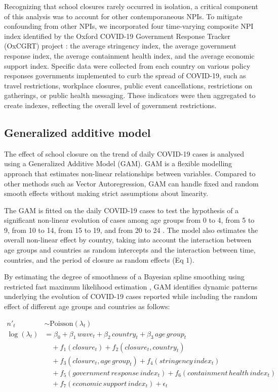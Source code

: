 \documentclass[]{interact}
\theoremstyle{plain}%
\theoremstyle{definition}
\theoremstyle{remark}
\begin{document}
Recognizing that school closures rarely occurred in isolation, a critical component of this analysis was to account for other contemporaneous NPIs. To mitigate confounding from other NPIs, we incorporated four time-varying composite NPI index identified by the Oxford COVID-19 Government Response Tracker (OxCGRT) project \citep{hale2021global}: the average stringency index, the average government response index, the average containment health index, and the average economic support index. Specific data were collected from each country on various policy responses governments implemented to curb the spread of COVID-19, such as travel restrictions, workplace closures, public event cancellations, restrictions on gatherings, or public health messaging. These indicators were then aggregated to create indexes, reflecting the overall level of government restrictions.

\subsection{Generalized additive model}\label{generalized-additive-model}

The effect of school closure on the trend of daily COVID-19 cases is analysed using a Generalized Additive Model (GAM). GAM is a flexible modelling approach that estimates non-linear relationships between variables. Compared to other methods such as Vector Autoregression, GAM can handle fixed and random smooth effects without making strict assumptions about linearity.

The GAM is fitted on the daily COVID-19 cases to test the hypothesis of a significant non-linear evolution of cases among age groups from 0 to 4, from 5 to 9, from 10 to 14, from 15 to 19, and from 20 to 24 \citep{wood2017generalized}. The model also estimates the overall non-linear effect by country, taking into account the interaction between age groups and countries as random intercepts and the interaction between time, countries, and the period of closure as random effects (Eq 1).

By estimating the degree of smoothness of a Bayesian spline smoothing using restricted fast maximum likelihood estimation \citep{wood2011fast}, GAM identifies dynamic patterns underlying the evolution of COVID-19 cases reported while including the random effect of different age groups and countries as follows:

\begin{align*}
  \tag{1}
  n\prime_t &\sim \text{Poisson}(\lambda_t) \\
  \log(\lambda_t) &= \beta_0 + \beta_1\,wave_t + \beta_2\,country_t + \beta_3\,age\,group_t \\
  &\quad + f_1(closure_t) + f_2(closure_t, country_t) \\
  &\quad + f_3(closure_t, age\,group_t) + f_4(stringency\,index_t) \\
  &\quad + f_5(government\,response\,index_t) + f_6(containment\,health\,index_t) \\
  &\quad + f_7(economic\,support\,index_t) +\epsilon_t
\end{align*}
\end{document}
